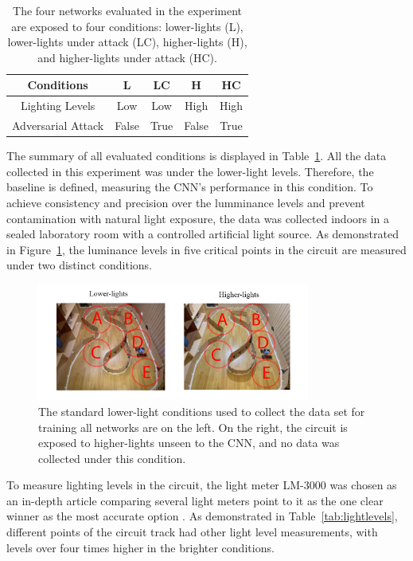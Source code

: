 \documentclass[12pt]{article}
\begin{document}
\begin{table}[H]
\begin{center}
\begin{tabular}{ |c|c|c|c|c| } 
\hline
Conditions & L & LC & H & HC \\
\hline
Lighting Levels & Low & Low & High & High \\
Adversarial Attack & False & True  & False & True \\
\hline
\end{tabular}
\caption{\label{tab:conditions}The four networks evaluated in the experiment are exposed to four conditions: lower-lights (L), lower-lights under attack (LC), higher-lights (H), and higher-lights under attack (HC).}
\end{center}
\end{table}

The summary of all evaluated conditions is displayed in Table~\ref{tab:conditions}. All the data collected in this experiment was under the lower-light levels. Therefore, the baseline is defined, measuring the CNN's performance in this condition. To achieve consistency and precision over the lumminance levels and prevent contamination with natural light exposure, the data was collected indoors in a sealed laboratory room with a controlled artificial light source. As demonstrated in Figure~\ref{fig:light}, the luminance levels in five critical points in the circuit are measured under two distinct conditions.  

\begin{figure}[H]
\begin{center}
\includegraphics[width=0.8\textwidth]{figures/lights.png}
\caption{ The standard lower-light conditions used to collect the data set for training all networks are on the left. On the right, the circuit is exposed to higher-lights unseen to the CNN, and no data was collected under this condition. }
\label{fig:light}
\end{center}
\end{figure}

To measure lighting levels in the circuit, the light meter LM-3000 \parencite{lightmeteraccuracy} was chosen as an in-depth article comparing several light meters point to it as the one clear winner as the most accurate option \parencite{lightmeter}. As demonstrated in Table~\ref{tab:lightlevels}, different points of the circuit track had other light level measurements, with levels over four times higher in the brighter conditions.
\end{document}
